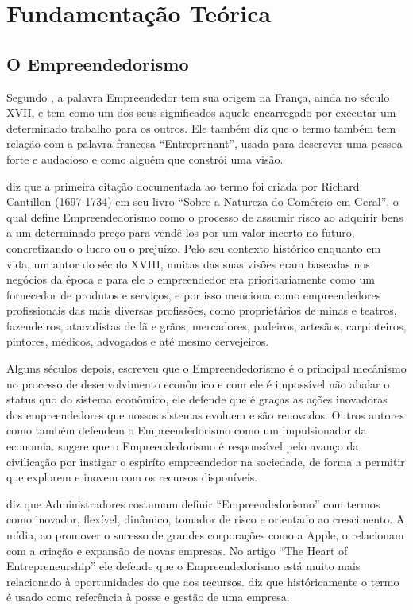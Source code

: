 \chapter[Fundamentação Teórica]{Fundamentação Teórica}
\label{cap-fundamentacao_teorica}

\section{O Empreendedorismo}
\label{section:o_empreendedorismo}

Segundo \cite{McCall2000}, a palavra Empreendedor tem sua origem na França, ainda no século XVII, e tem como um dos seus significados aquele encarregado por executar um determinado trabalho para os outros. Ele também diz que o termo também tem relação com a palavra francesa ``Entreprenant'', usada para descrever uma pessoa forte e audacioso e como alguém que constrói uma visão.

\cite{Brown2013} diz que a primeira citação documentada ao termo foi criada por Richard Cantillon (1697-1734) em seu livro ``Sobre a Natureza do Comércio em Geral'', o qual define Empreendedorismo como o processo de assumir risco ao adquirir bens a um determinado preço para vendê-los por um valor incerto no futuro, concretizando o lucro ou o prejuízo. Pelo seu contexto histórico enquanto em vida, um autor do século XVIII, muitas das suas visões eram baseadas nos negócios da época e para ele o empreendedor era prioritariamente como um fornecedor de produtos e serviços, e por isso menciona como empreendedores profissionais das mais diversas profissões, como proprietários de minas e teatros, fazendeiros, atacadistas de lã e grãos, mercadores, padeiros, artesãos, carpinteiros, pintores, médicos, advogados e até mesmo cervejeiros. 

Alguns séculos depois, \cite{Schumpeter1934} escreveu que o Empreendedorismo é o principal mecânismo no processo de desenvolvimento econômico e com ele é impossível não abalar o status quo do sistema econômico, ele defende que é graças as ações inovadoras dos empreendedores que nossos sistemas evoluem e são renovados. Outros autores como \cite{Holcombe1998, Acs2006} também defendem o Empreendedorismo como um impulsionador da economia. \cite{McClelland1961} sugere que o Empreendedorismo é responsável pelo avanço da civilicação por instigar o espiríto empreendedor na sociedade, de forma a permitir que explorem e inovem com os recursos disponíveis.

\cite{Stevenson1985} diz que Administradores costumam definir ``Empreendedorismo'' com termos como inovador, flexível, dinâmico, tomador de risco e orientado ao crescimento. A mídia, ao promover o sucesso de grandes corporações como a Apple, o relacionam com a criação e expansão de novas empresas. No artigo ``The Heart of Entrepreneurship'' ele defende que o Empreendedorismo está muito mais relacionado à oportunidades do que aos recursos. \cite{Acs2006} diz que históricamente o termo é usado como referência à posse e gestão de uma empresa.

